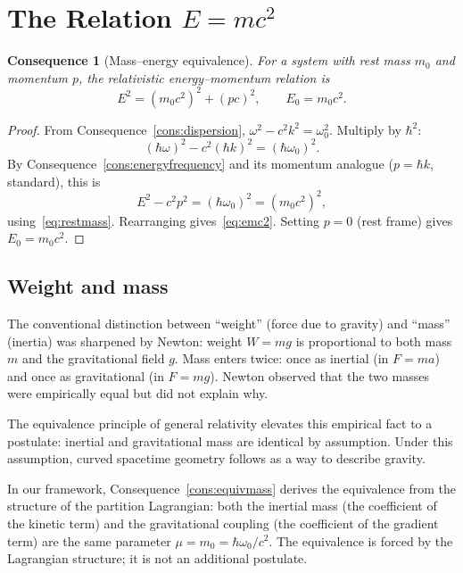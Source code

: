 \documentclass[11pt,twocolumn,a4paper]{article}
\theoremstyle{axiomstyle}
\theoremstyle{conseqstyle}
\newtheorem{consequence}{Consequence}
\theoremstyle{definition}
\theoremstyle{remark}
\begin{document}
\section{The Relation $E=mc^{2}$}
\label{sec:emc2}

\begin{consequence}[Mass--energy equivalence]
\label{cons:emc2}
For a system with rest mass $m_{0}$ and momentum $p$, the relativistic energy--momentum relation is
\begin{equation}
E^{2}=(m_{0}c^{2})^{2}+(pc)^{2},\qquad E_{0}=m_{0}c^{2}.
\label{eq:emc2}
\end{equation}
\end{consequence}

\begin{proof}
From Consequence~\ref{cons:dispersion}, $\omega^{2}-c^{2}k^{2}=\omega_{0}^{2}$. Multiply by $\hbar^{2}$:
\begin{equation*}
(\hbar\omega)^{2}-c^{2}(\hbar k)^{2}=(\hbar\omega_{0})^{2}.
\end{equation*}
By Consequence~\ref{cons:energyfrequency} and its momentum analogue ($p=\hbar k$, standard), this is
\begin{equation*}
E^{2}-c^{2}p^{2}=(\hbar\omega_{0})^{2}=(m_{0}c^{2})^{2},
\end{equation*}
using~\eqref{eq:restmass}. Rearranging gives~\eqref{eq:emc2}. Setting $p=0$ (rest frame) gives $E_{0}=m_{0}c^{2}$.
\end{proof}

\subsection{Weight and mass}

The conventional distinction between ``weight'' (force due to gravity) and ``mass'' (inertia) was sharpened by Newton: weight $W=mg$ is proportional to both mass $m$ and the gravitational field $g$. Mass enters twice: once as inertial (in $F=ma$) and once as gravitational (in $F=mg$). Newton observed that the two masses were empirically equal but did not explain why.

The equivalence principle of general relativity elevates this empirical fact to a postulate: inertial and gravitational mass are identical by assumption. Under this assumption, curved spacetime geometry follows as a way to describe gravity.

In our framework, Consequence~\ref{cons:equivmass} derives the equivalence from the structure of the partition Lagrangian: both the inertial mass (the coefficient of the kinetic term) and the gravitational coupling (the coefficient of the gradient term) are the same parameter $\mu=m_{0}=\hbar\omega_{0}/c^{2}$. The equivalence is forced by the Lagrangian structure; it is not an additional postulate.
\end{document}
